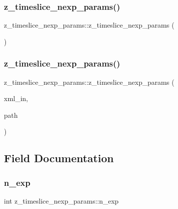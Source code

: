 \subsubsection{\texorpdfstring{z\_timeslice\_nexp\_params()}{z\_timeslice\_nexp\_params()}\hspace{0.1cm}{\footnotesize\ttfamily [3/4]}}
{\footnotesize\ttfamily z\+\_\+timeslice\+\_\+nexp\+\_\+params\+::z\+\_\+timeslice\+\_\+nexp\+\_\+params (\begin{DoxyParamCaption}{ }\end{DoxyParamCaption})\hspace{0.3cm}{\ttfamily [inline]}}

\mbox{\label{structz__timeslice__nexp__params_ac623b4d5088b21d5a8e5b2054a8c1fcf}} 
\subsubsection{\texorpdfstring{z\_timeslice\_nexp\_params()}{z\_timeslice\_nexp\_params()}\hspace{0.1cm}{\footnotesize\ttfamily [4/4]}}
{\footnotesize\ttfamily z\+\_\+timeslice\+\_\+nexp\+\_\+params\+::z\+\_\+timeslice\+\_\+nexp\+\_\+params (\begin{DoxyParamCaption}\item[{X\+M\+L\+Reader \&}]{xml\+\_\+in,  }\item[{const string \&}]{path }\end{DoxyParamCaption})}



\subsection{Field Documentation}
\mbox{\label{structz__timeslice__nexp__params_a767b08b06630e4d6f76a314bdd77338e}} 
\subsubsection{\texorpdfstring{n\_exp}{n\_exp}}
{\footnotesize\ttfamily int z\+\_\+timeslice\+\_\+nexp\+\_\+params\+::n\+\_\+exp}

